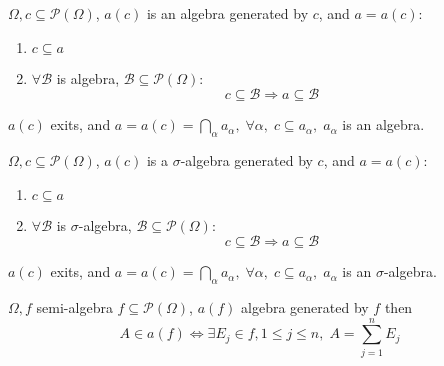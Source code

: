 \begin{definition}
	$ \Omega, c \subseteq \mathcal{P}\left(\Omega\right) $, $ a \left(c\right) $ is an algebra generated by $ c $, and $ a = a\left(c\right) $:
	\begin{enumerate}
		\item $ c \subseteq a $ 
		\item $ \forall  \mathcal{B} $ is algebra, $ \mathcal{B} \subseteq \mathcal{P}\left(\Omega\right) $:
		\begin{equation}
		 c \subseteq \mathcal{B} \Rightarrow a \subseteq \mathcal{B} 
		\end{equation}
	\end{enumerate}
\end{definition}

\begin{remark}
	$ a\left(c\right) $ exits, and $a = a\left( c \right) = \bigcap\limits_\alpha  {{a_\alpha }} ,\;\forall \alpha ,\;c \subseteq {a_\alpha },\;{a_\alpha }$ is an algebra.
\end{remark}

\begin{definition}
	$ \Omega, c \subseteq \mathcal{P}\left(\Omega\right) $, $ a \left(c\right) $ is a $ \sigma $-algebra generated by $ c $, and $ a = a\left(c\right) $:
	\begin{enumerate}
		\item $ c \subseteq a $ 
		\item $ \forall  \mathcal{B} $ is $ \sigma $-algebra, $ \mathcal{B} \subseteq \mathcal{P}\left(\Omega\right) $:
		\begin{equation}
		c \subseteq \mathcal{B} \Rightarrow a \subseteq \mathcal{B} 
		\end{equation}
	\end{enumerate}
\label{def2.5}
\end{definition}

\begin{remark}
	$ a\left(c\right) $ exits, and $a = a\left( c \right) = \bigcap\limits_\alpha  {{a_\alpha }} ,\;\forall \alpha ,\;c \subseteq {a_\alpha },\;{a_\alpha }$ is an $ \sigma $-algebra.
	\label{rmk2.5}
\end{remark}

\begin{lemma}
	$ \Omega, f $ semi-algebra $ f \subseteq \mathcal{P}\left(\Omega\right) $, $ a\left(f\right) $ algebra generated by $ f $ then 
	\begin{equation}
	A \in a\left(f\right) \Leftrightarrow \exists {E_j} \in f,1 \leqslant j \leqslant n,\;A = \sum\limits_{j = 1}^n {{E_j}} 
	\end{equation}
	\label{lma2.1}
\end{lemma}

